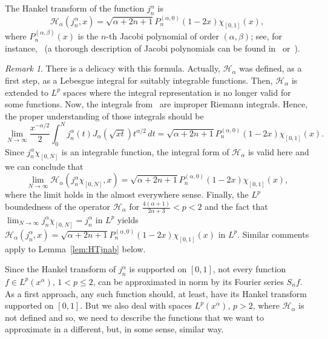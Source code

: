 \documentclass[reqno]{amsart}
\theoremstyle{plain}
\theoremstyle{definition}
\theoremstyle{remark}
\newtheorem*{Rem}{Remark}
\newcommand{\htr}{\mathcal{H}_\alpha} %
\begin{document}
The Hankel transform of the function $j_n^\alpha$ is
\begin{equation*}
   \htr(j_n^\alpha,x) = \sqrt{\alpha+2n+1} P_n^{(\alpha,0)}(1-2x)
   \chi_{[0,1]}(x),
\end{equation*}
where $P_n^{(\alpha,\beta)}(x)$ is the $n$-th Jacobi polynomial of order
$(\alpha,\beta)$; see, for instance,~\cite[Ch.~8.11, (5), p.~47]{E-TIT} (a
thorough description of Jacobi polynomials can be found in~\cite[Ch.~X]{E-HTF}
or~\cite{Sze}). 

\begin{Rem}
There is a delicacy with this formula. Actually, $\htr$ was defined, as a
first step, as a Lebesgue integral for suitably integrable functions. Then,
$\htr$ is extended to $L^p$ spaces where the integral representation is no
longer valid for some functions. Now, the integrals from~\cite[Ch.~8.11, (5),
p.~47]{E-TIT} are improper Riemann integrals. Hence, the proper understanding
of those integrals should be
\begin{equation*}
   \lim_{N\to\infty}
   \frac{x^{-\alpha/2}}{2}
   \int_0^N {j_n^\alpha(t) J_\alpha (\sqrt {xt})t^{\alpha /2}\,dt} =
   \sqrt{\alpha+2n+1} P_n^{(\alpha,0)}(1-2x) \chi_{[0,1]}(x).
\end{equation*}
Since $j_n^\alpha \chi_{[0,N]}$ is an integrable function, the integral form
of $\htr$ is valid here and we can conclude that
\begin{equation*}
   \lim_{N\to\infty}
   \htr(j_n^\alpha \chi_{[0,N]},x)
   = \sqrt{\alpha+2n+1} P_n^{(\alpha,0)}(1-2x) \chi_{[0,1]}(x),
\end{equation*}
where the limit holds in the almost everywhere sense. Finally, the $L^p$
boundedness of the operator $\htr$ for $\frac{4(\alpha+1)}{2\alpha+3} < p < 2$
and the fact that $\lim_{N\to\infty} j_n^\alpha \chi_{[0,N]} = j_n^\alpha$ in
$L^p$ yields $\htr(j_n^\alpha,x) = \sqrt{\alpha+2n+1} P_n^{(\alpha,0)}(1-2x)
\chi_{[0,1]}(x)$ in $L^p$. Similar comments apply to Lemma~\ref{lem:HTjnab}
below.
\end{Rem}

Since the Hankel transform of $j_n^\alpha$ is supported on
$[0,1]$, not every function $f \in L^p(x^\alpha)$, $1 < p \leq 2$,
can be approximated in norm by its Fourier series $S_nf$. As a first approach,
any such function should, at least, have its Hankel transform supported
on $[0,1]$. But we also deal with spaces $L^p(x^\alpha)$, $p>2$,
where $\htr$ is not defined and so, we need to describe the functions that
we want to approximate in a different, but, in some sense, similar way.
\end{document}
